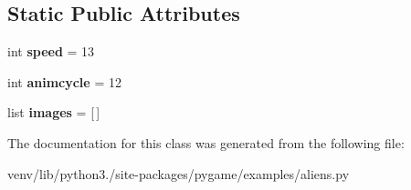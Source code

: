 \subsection*{Static Public Attributes}
\begin{DoxyCompactItemize}
\item 
\mbox{\label{classpygame_1_1examples_1_1aliens_1_1_alien_a9eae2341a3260718463937dccb9a31c3}} 
int {\bfseries speed} = 13
\item 
\mbox{\label{classpygame_1_1examples_1_1aliens_1_1_alien_a8f85273b5191806f3851eaf96d2b004e}} 
int {\bfseries animcycle} = 12
\item 
\mbox{\label{classpygame_1_1examples_1_1aliens_1_1_alien_af1a00a6d542d0d7da2f7248e336db0f7}} 
list {\bfseries images} = \mbox{[}$\,$\mbox{]}
\end{DoxyCompactItemize}


The documentation for this class was generated from the following file\+:\begin{DoxyCompactItemize}
\item 
venv/lib/python3./site-\/packages/pygame/examples/aliens.\+py\end{DoxyCompactItemize}
